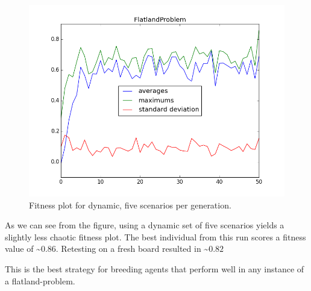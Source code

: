 \documentclass[twoside]{article}
\begin{document}
\begin{multicols}{2}
  \begin{figure}[H]
    \centering
    \includegraphics[width=\linewidth]{images/dynamic_5.png}
    \caption{Fitness plot for dynamic, five scenarios per generation.} \label{fig:static-single}
  \end{figure}

  As we can see from the figure, using a dynamic set of five scenarios yields a slightly less chaotic fitness plot.
  The best individual from this run scores a fitness value of \textasciitilde $0.86$.
  Retesting on a fresh board resulted in \textasciitilde $0.82$

  This is the best strategy for breeding agents that perform well in any instance of a flatland-problem.


\end{multicols}

%
%
\end{document}
